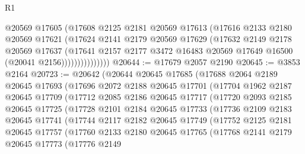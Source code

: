 \begin{lexlean}{R1}
\begin{coremodule}
                      @20569
                      @17605
                      (@17608
                        @2125
                        @2181
                        @20569
                        @17613
                        (@17616
                          @2133
                          @2180
                          @20569
                          @17621
                          (@17624
                            @2141
                            @2179
                            @20569
                            @17629
                            (@17632
                              @2149
                              @2178
                              @20569
                              @17637
                              (@17641
                                @2157
                                @2177
                                @3472
                                @16483
                                @20569
                                @17649
                                @16500
                                (@20041 @2156)))))))))))))))
@20644 := @17679 @2057 @2190
@20645 := @3853 @2164
@20723 := @20642
    (@20644
      @20645
      @17685
      (@17688
        @2064
        @2189
        @20645
        @17693
        (@17696
          @2072
          @2188
          @20645
          @17701
          (@17704
            @1962
            @2187
            @20645
            @17709
            (@17712
              @2085
              @2186
              @20645
              @17717
              (@17720
                @2093
                @2185
                @20645
                @17725
                (@17728
                  @2101
                  @2184
                  @20645
                  @17733
                  (@17736
                    @2109
                    @2183
                    @20645
                    @17741
                    (@17744
                      @2117
                      @2182
                      @20645
                      @17749
                      (@17752
                        @2125
                        @2181
                        @20645
                        @17757
                        (@17760
                          @2133
                          @2180
                          @20645
                          @17765
                          (@17768
                            @2141
                            @2179
                            @20645
                            @17773
                            (@17776
                              @2149

\end{coremodule}
\end{lexlean}
